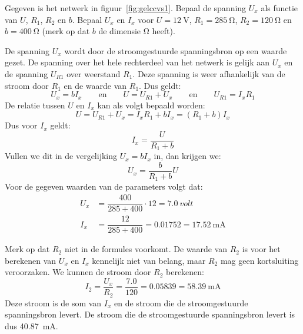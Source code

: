 \begin{example}
Gegeven is het netwerk in figuur~\ref{fig:gelccvs1}. Bepaal de spanning $U_x$ als functie van $U$, $R_1$, $R_2$ en $b$. Bepaal $U_x$ en $I_x$ voor $U=\SI{12}{\volt}$, $R_1=\SI{285}{\ohm}$, $R_2=\SI{120}{\ohm}$ en $b=\SI{400}{\ohm}$ (merk op dat $b$ de dimensie \si{\ohm} heeft).

\begin{center}
\label{fig:gelccvs1}
\end{center}

De spanning $U_x$ wordt door de stroomgestuurde spanningsbron op een waarde gezet. De spanning over het hele rechterdeel van het netwerk is gelijk aan $U_x$ en de spanning $U_{R1}$ over weerstand $R_1$. Deze spanning is weer afhankelijk van de stroom door $R_1$ en de waarde van $R_1$. Dus geldt:
%
\begin{equation}
U_x = bI_x \qquad\text{en}\qquad U = U_{R1}+U_x \qquad\text{en}\qquad U_{R1} = I_xR_1
\end{equation}
%
De relatie tussen $U$ en $I_x$ kan als volgt bepaald worden:
%
\begin{equation}
U = U_{R1} + U_x = I_xR_1 + bI_x = (R_1+b)I_x
\end{equation}
%
Dus voor $I_x$ geldt:
%
\begin{equation}
I_x = \dfrac{U}{R_1+b}
\end{equation}
%
Vullen we dit in de vergelijking $U_x = bI_x$ in, dan krijgen we:
\begin{equation}
U_x = \dfrac{b}{R_1+b}U
\end{equation}
%
Voor de gegeven waarden van de parameters volgt dat:
%
\begin{equation}
\begin{split}
U_x &= \dfrac{400}{285+400}\cdot12 = \SI{7.0}{volt} \\
I_x &= \dfrac{12}{285+400} = \num{0.01752} = \SI{17.52}{\mA}
\end{split}
\end{equation}

Merk op dat $R_2$ niet in de formules voorkomt. De waarde van $R_2$ is voor het berekenen van $U_x$ en $I_x$ kennelijk niet van belang, maar $R_2$ mag geen kortsluiting veroorzaken. We kunnen de stroom door $R_2$ berekenen:
%
\begin{equation}
I_2 = \dfrac{U_x}{R_2} = \dfrac{\num{7.0}}{\num{120}} = \num{0.05839} = \SI{58,39}{\mA}
\end{equation}
%
Deze stroom is de som van $I_x$ en de stroom die de stroomgestuurde spanningsbron levert. De stroom die de stroomgestuurde spanningsbron levert is dus \SI{40.87}{\mA}. 
\end{example}

